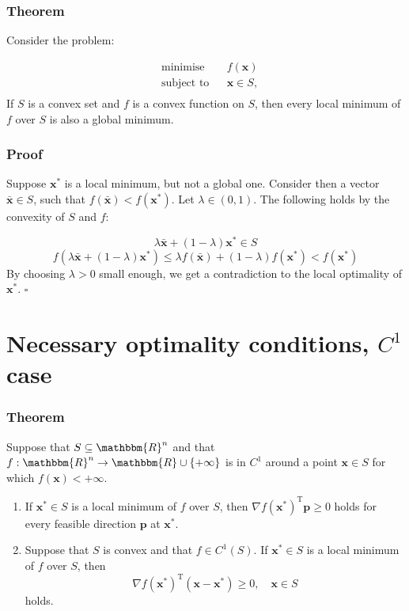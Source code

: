 \documentclass[12pt, a4paper]{article}
\begin{document}
\subsubsection*{Theorem}
Consider the problem:

\begin{equation*}
\begin{aligned}
& {\text{minimise}}
& & f(\bm{x}) \\
& \text{subject to}
& & \bm{x}\in S,\\
\end{aligned}
\end{equation*}
If $S$ is a convex set and $f$ is a convex function on $S$, then every local minimum of $f$ over $S$ is also a global minimum.
\subsubsection*{Proof}
Suppose $\bm{x}^*$ is a local minimum, but not a global one. Consider then a vector $\bar{\bm{x}}\in S$, such that $f(\bar{\bm{x}})<f(\bm{x}^*)$. Let $\lambda \in (0,1)$. The following holds by the convexity of $S$ and $f$:

\[
    \lambda \bar{\bm{x}} + (1-\lambda)\bm{x}^* \in S
\]
\[
    f(\lambda\bar{\bm{x}}+(1-\lambda)\bm{x}^*) \leq \lambda f(\bar{\bm{x}}) + (1-\lambda)f(\bm{x}^*) < f(\bm{x}^*)
\]
By choosing $\lambda>0$ small enough, we get a contradiction to the local optimality of $\bm{x}^*$. $\square$

\section{Necessary optimality conditions, $C^1$ case}
\subsubsection*{Theorem}
Suppose that $S\subseteq \mathbbm{R}^n$ and that $f : \mathbbm{R}^n \rightarrow \mathbbm{R}\cup \{+\infty\}$ is in $C^1$ around a point $\bm{x}\in S$ for which $f(\bm{x})<+\infty$.
\begin{enumerate}[label={(\alph*)}]
    \item If $\bm{x}^* \in S$ is a local minimum of $f$ over $S$, then $\nabla f(\bm{x}^*)^{\text{T}}\bm{p} \geq 0$ holds for every feasible direction $\bm{p}$ at $\bm{x^*}$.
    \item Suppose that $S$ is convex and that $f\in C^1(S)$. If $\bm{x^*}\in S$ is a local minimum of $f$ over $S$, then
    \begin{equation}
    \label{exp}
    \nabla f(\bm{x}^*)^{\text{T}}(\bm{x}-\bm{x}^*)\geq 0, \quad \bm{x}\in S
    \end{equation}
    holds.
\end{enumerate}
\end{document}
